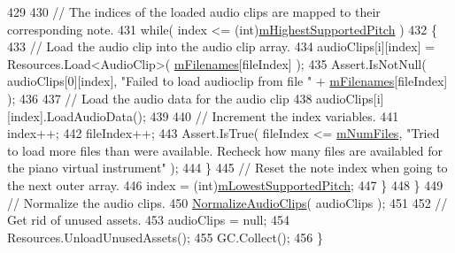 \begin{DoxyCode}
429 
430                 \textcolor{comment}{// The indices of the loaded audio clips are mapped to their corresponding note. }
431                 \textcolor{keywordflow}{while}( index <= (\textcolor{keywordtype}{int})\hyperlink{group___v_i_base_pro_var_ga61fb2c33b53a0f663047779d7ceb18f3}{mHighestSupportedPitch} )
432                 \{
433                     \textcolor{comment}{// Load the audio clip into the audio clip array.}
434                     audioClips[i][index] = Resources.Load<AudioClip>( \hyperlink{group___v_i_base_pro_var_gab2add474ca506357688b5dd08cac4cb5}{mFilenames}[fileIndex] );
435                     Assert.IsNotNull( audioClips[0][index], \textcolor{stringliteral}{"Failed to load audioclip from file "} + 
      \hyperlink{group___v_i_base_pro_var_gab2add474ca506357688b5dd08cac4cb5}{mFilenames}[fileIndex] );
436 
437                     \textcolor{comment}{// Load the audio data for the audio clip}
438                     audioClips[i][index].LoadAudioData();
439 
440                     \textcolor{comment}{// Increment the index variables.}
441                     index++;
442                     fileIndex++;
443                     Assert.IsTrue( fileIndex <= \hyperlink{group___v_i_base_pro_var_ga9a602db8c9833ce75d95dd453c27d341}{mNumFiles}, \textcolor{stringliteral}{"Tried to load more files than were
       available. Recheck how many files are availabled for the piano virtual instrument"} );
444                 \}
445                 \textcolor{comment}{// Reset the note index when going to the next outer array. }
446                 index = (int)\hyperlink{group___v_i_base_pro_var_ga3cae52b1bcc0178a8a6b03c7aaf7aac8}{mLowestSupportedPitch};
447             \}
448         \}
449         \textcolor{comment}{// Normalize the audio clips.}
450         \hyperlink{group___v_i_base_priv_func_ga0262de8cfb1e671b01ba76de2e9d140a}{NormalizeAudioClips}( audioClips );
451 
452         \textcolor{comment}{// Get rid of unused assets.}
453         audioClips = null;
454         Resources.UnloadUnusedAssets();
455         GC.Collect();
456     \}
\end{DoxyCode}
